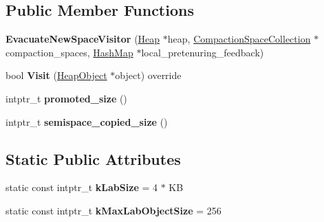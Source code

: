 \subsection*{Public Member Functions}
\begin{DoxyCompactItemize}
\item 
{\bfseries Evacuate\+New\+Space\+Visitor} (\hyperlink{classv8_1_1internal_1_1_heap}{Heap} $\ast$heap, \hyperlink{classv8_1_1internal_1_1_compaction_space_collection}{Compaction\+Space\+Collection} $\ast$compaction\+\_\+spaces, \hyperlink{classv8_1_1internal_1_1_template_hash_map_impl}{Hash\+Map} $\ast$local\+\_\+pretenuring\+\_\+feedback)\hypertarget{classv8_1_1internal_1_1_mark_compact_collector_1_1_evacuate_new_space_visitor_ac525ad4703897a0cffb8c59cf6cc94f7}{}\label{classv8_1_1internal_1_1_mark_compact_collector_1_1_evacuate_new_space_visitor_ac525ad4703897a0cffb8c59cf6cc94f7}

\item 
bool {\bfseries Visit} (\hyperlink{classv8_1_1internal_1_1_heap_object}{Heap\+Object} $\ast$object) override\hypertarget{classv8_1_1internal_1_1_mark_compact_collector_1_1_evacuate_new_space_visitor_aa71aa2d44e2ed29e9715c57bb59c8cc2}{}\label{classv8_1_1internal_1_1_mark_compact_collector_1_1_evacuate_new_space_visitor_aa71aa2d44e2ed29e9715c57bb59c8cc2}

\item 
intptr\+\_\+t {\bfseries promoted\+\_\+size} ()\hypertarget{classv8_1_1internal_1_1_mark_compact_collector_1_1_evacuate_new_space_visitor_ada2dd34d764ef421f1a60efd80677797}{}\label{classv8_1_1internal_1_1_mark_compact_collector_1_1_evacuate_new_space_visitor_ada2dd34d764ef421f1a60efd80677797}

\item 
intptr\+\_\+t {\bfseries semispace\+\_\+copied\+\_\+size} ()\hypertarget{classv8_1_1internal_1_1_mark_compact_collector_1_1_evacuate_new_space_visitor_ad45a00dfa89105e81759906cae122562}{}\label{classv8_1_1internal_1_1_mark_compact_collector_1_1_evacuate_new_space_visitor_ad45a00dfa89105e81759906cae122562}

\end{DoxyCompactItemize}
\subsection*{Static Public Attributes}
\begin{DoxyCompactItemize}
\item 
static const intptr\+\_\+t {\bfseries k\+Lab\+Size} = 4 $\ast$ KB\hypertarget{classv8_1_1internal_1_1_mark_compact_collector_1_1_evacuate_new_space_visitor_a0e8bb1fb6718bb60d75aa05e80d58095}{}\label{classv8_1_1internal_1_1_mark_compact_collector_1_1_evacuate_new_space_visitor_a0e8bb1fb6718bb60d75aa05e80d58095}

\item 
static const intptr\+\_\+t {\bfseries k\+Max\+Lab\+Object\+Size} = 256\hypertarget{classv8_1_1internal_1_1_mark_compact_collector_1_1_evacuate_new_space_visitor_a5df32a8179df9c5e2a496c36859678af}{}\label{classv8_1_1internal_1_1_mark_compact_collector_1_1_evacuate_new_space_visitor_a5df32a8179df9c5e2a496c36859678af}

\end{DoxyCompactItemize}
